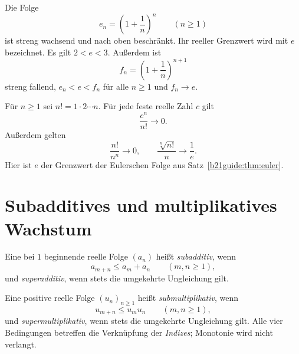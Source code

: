 \begin{theorem}
\label{b21guide:thm:euler}
Die Folge
\[
 e_n=\left(1+\frac1n\right)^n\qquad(n\geq1)
\]
ist streng wachsend und nach oben beschränkt.
Ihr reeller Grenzwert wird mit $e$ bezeichnet.
Es gilt $2<e<3$. Außerdem ist
\[
 f_n=\left(1+\frac1n\right)^{n+1}
\]
streng fallend, $e_n<e<f_n$ für alle $n\geq1$ und $f_n\to e$.
\end{theorem}

\begin{theorem}
\label{b21guide:thm:factorial-growth}
Für $n\geq1$ sei $n!=1\cdot2\cdots n$.
Für jede feste reelle Zahl $c$ gilt
\[
 \frac{c^n}{n!}\longrightarrow0.
\]
Außerdem gelten
\[
 \frac{n!}{n^n}\longrightarrow0,\qquad
 \frac{\sqrt[n]{n!}}{n}\longrightarrow\frac1e.
\]
Hier ist $e$ der Grenzwert der Eulerschen Folge aus
Satz~\ref{b21guide:thm:euler}.
\end{theorem}

\section{Subadditives und multiplikatives Wachstum}

\begin{definition}
\label{b21guide:def:subadditive}
Eine bei $1$ beginnende reelle Folge $(a_n)$ heißt
\emph{subadditiv}, wenn
\[
 a_{m+n}\leq a_m+a_n\qquad(m,n\geq1),
\]
und \emph{superadditiv}, wenn stets die umgekehrte Ungleichung gilt.

Eine positive reelle Folge $(u_n)_{n\geq1}$ heißt
\emph{submultiplikativ}, wenn
\[
 u_{m+n}\leq u_mu_n\qquad(m,n\geq1),
\]
und \emph{supermultiplikativ}, wenn stets die umgekehrte
Ungleichung gilt. Alle vier Bedingungen betreffen die
Verknüpfung der \emph{Indizes}; Monotonie wird nicht verlangt.
\end{definition}

